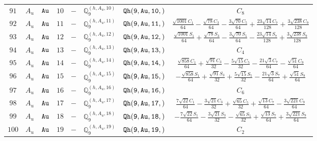 \documentclass[fleqn,8pt]{jsarticle}
\begin{document}
\begin{table}[ht!]
\begin{center}
\begin{tabular}{cccccccc}
$ 91 $ & $ A_{u} $ & $ {\tt Au} $ & $ 10 $ & $ - $ & $ \mathbb{Q}_{9}^{(h,A_{u},10)} $ & $ {\tt Qh(9,Au,10,)} $ & $ C_{8} $ \\
$ 92 $ & $ A_{u} $ & $ {\tt Au} $ & $ 11 $ & $ - $ & $ \mathbb{Q}_{9}^{(h,A_{u},11)} $ & $ {\tt Qh(9,Au,11,)} $ & $ \frac{\sqrt{1001} C_{1}}{64} - \frac{\sqrt{78} C_{3}}{64} - \frac{3 \sqrt{70} C_{5}}{64} + \frac{23 \sqrt{14} C_{7}}{128} + \frac{3 \sqrt{238} C_{9}}{128} $ \\
$ 93 $ & $ A_{u} $ & $ {\tt Au} $ & $ 12 $ & $ - $ & $ \mathbb{Q}_{9}^{(h,A_{u},12)} $ & $ {\tt Qh(9,Au,12,)} $ & $ \frac{\sqrt{1001} S_{1}}{64} + \frac{\sqrt{78} S_{3}}{64} - \frac{3 \sqrt{70} S_{5}}{64} - \frac{23 \sqrt{14} S_{7}}{128} + \frac{3 \sqrt{238} S_{9}}{128} $ \\
$ 94 $ & $ A_{u} $ & $ {\tt Au} $ & $ 13 $ & $ - $ & $ \mathbb{Q}_{9}^{(h,A_{u},13)} $ & $ {\tt Qh(9,Au,13,)} $ & $ C_{4} $ \\
$ 95 $ & $ A_{u} $ & $ {\tt Au} $ & $ 14 $ & $ - $ & $ \mathbb{Q}_{9}^{(h,A_{u},14)} $ & $ {\tt Qh(9,Au,14,)} $ & $ \frac{\sqrt{858} C_{1}}{64} + \frac{\sqrt{91} C_{3}}{32} - \frac{5 \sqrt{15} C_{5}}{32} - \frac{21 \sqrt{3} C_{7}}{64} - \frac{\sqrt{51} C_{9}}{64} $ \\
$ 96 $ & $ A_{u} $ & $ {\tt Au} $ & $ 15 $ & $ - $ & $ \mathbb{Q}_{9}^{(h,A_{u},15)} $ & $ {\tt Qh(9,Au,15,)} $ & $ - \frac{\sqrt{858} S_{1}}{64} + \frac{\sqrt{91} S_{3}}{32} + \frac{5 \sqrt{15} S_{5}}{32} - \frac{21 \sqrt{3} S_{7}}{64} + \frac{\sqrt{51} S_{9}}{64} $ \\
$ 97 $ & $ A_{u} $ & $ {\tt Au} $ & $ 16 $ & $ - $ & $ \mathbb{Q}_{9}^{(h,A_{u},16)} $ & $ {\tt Qh(9,Au,16,)} $ & $ C_{6} $ \\
$ 98 $ & $ A_{u} $ & $ {\tt Au} $ & $ 17 $ & $ - $ & $ \mathbb{Q}_{9}^{(h,A_{u},17)} $ & $ {\tt Qh(9,Au,17,)} $ & $ \frac{7 \sqrt{22} C_{1}}{64} - \frac{3 \sqrt{21} C_{3}}{32} + \frac{\sqrt{65} C_{5}}{32} + \frac{\sqrt{13} C_{7}}{64} - \frac{3 \sqrt{221} C_{9}}{64} $ \\
$ 99 $ & $ A_{u} $ & $ {\tt Au} $ & $ 18 $ & $ - $ & $ \mathbb{Q}_{9}^{(h,A_{u},18)} $ & $ {\tt Qh(9,Au,18,)} $ & $ - \frac{7 \sqrt{22} S_{1}}{64} - \frac{3 \sqrt{21} S_{3}}{32} - \frac{\sqrt{65} S_{5}}{32} + \frac{\sqrt{13} S_{7}}{64} + \frac{3 \sqrt{221} S_{9}}{64} $ \\
$ 100 $ & $ A_{u} $ & $ {\tt Au} $ & $ 19 $ & $ - $ & $ \mathbb{Q}_{9}^{(h,A_{u},19)} $ & $ {\tt Qh(9,Au,19,)} $ & $ C_{2} $ \\
 \hline \hline
\end{tabular}
\end{center}
\end{table}
\end{document}
